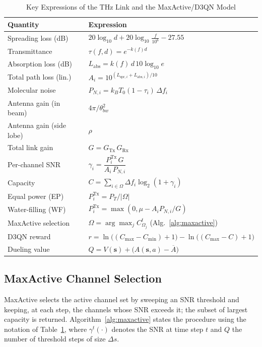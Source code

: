 \documentclass[journal]{IEEEtran}
\begin{document}
\begin{table}[!tbp]
\centering
\caption{Key Expressions of the THz Link and the MaxActive/D3QN Model}
\label{tab:formulas}
\footnotesize
\renewcommand{\arraystretch}{1.15}
\begin{tabular}{@{}p{} p{}@{}}
\toprule
Quantity & Expression\\
\midrule
Spreading loss (dB) & $20\log_{10} d + 20\log_{10}\!\frac{f}{10^{6}} - 27.55$\\
Transmittance & $\tau(f,d)=e^{-k(f)d}$\\
Absorption loss (dB) & $L_{\text{abs}}=k(f)\,d\,10\log_{10}e$\\
Total path loss (lin.) & $A_i=10^{(L_{\text{spr},i}+L_{\text{abs},i})/10}$\\
Molecular noise & $P_{N,i}=k_B T_0 (1-\tau_i)\,\Delta f_i$\\
Antenna gain (in beam) & $4\pi/\theta_{bw}^2$\\
Antenna gain (side lobe) & $\rho$\\
Total link gain & $G=G_{\text{Tx}}\,G_{\text{Rx}}$\\
Per-channel SNR & $\gamma_i=\dfrac{P_i^{\text{Tx}}\,G}{A_i\,P_{N,i}}$\\
Capacity & $C=\sum_{i\in\Omega}\Delta f_i\log_2(1+\gamma_i)$\\
Equal power (EP) & $P_i^{\text{Tx}}=P_T/|\Omega|$\\
Water-filling (WF) & $P_i^{\text{Tx}}=\max(0,\mu-A_iP_{N,i}/G)$\\
MaxActive selection & $\Omega=\arg\max_j C^{t}_{\Omega_j}$ (Alg.~\ref{alg:maxactive})\\
D3QN reward & $r=\ln\!\big((C_{\max}{-}C_{\min}){+}1\big)-\ln\!\big((C_{\max}{-}C){+}1\big)$\\
Dueling value & $Q=V(\mathbf{s})+\big(A(\mathbf{s},a)-\overline{A}\big)$\\
\bottomrule
\end{tabular}
\end{table}

\subsection{MaxActive Channel Selection}
MaxActive selects the active channel set by sweeping an SNR threshold and keeping, at
each step, the channels whose SNR exceeds it; the subset of largest capacity is
returned. Algorithm~\ref{alg:maxactive} states the procedure using the notation of
Table~\ref{tab:formulas}, where $\gamma^{t}(\cdot)$ denotes the SNR at time step $t$ and
$Q$ the number of threshold steps of size $\Delta s$.
\end{document}
